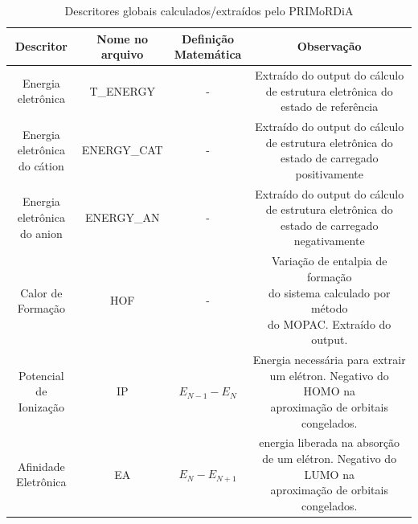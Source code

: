\documentclass[a4paper,11pt]{refart}
\begin{document}
\hspace*{-\leftmarginwidth}
\begin{minipage}{\fullwidth}
\begin{table}[H]
\centering	
\caption{Descritores globais calculados/extraídos pelo PRIMoRDiA}
\begin{tabular}{c|c|c|c}
\toprule
Descritor &\makecell{Nome no\\ arquivo}&\makecell{Definição\\Matemática}&Observação \\
\midrule
\makecell{Energia \\eletrônica} & T\_ENERGY&-&\makecell{Extraído do output do cálculo\\ de estrutura eletrônica do \\estado de referência}\\\hline
\makecell{Energia \\eletrônica\\do cátion} &ENERGY\_CAT &-& \makecell{Extraído do output do cálculo\\ de estrutura eletrônica do \\estado de carregado positivamente}\\\hline
\makecell{Energia \\eletrônica\\do anion} &ENERGY\_AN &-&\makecell{Extraído do output do cálculo\\ de estrutura eletrônica do \\estado de carregado negativamente}\\\hline
\makecell{Calor de\\Formação} & HOF&-&\makecell{Variação de entalpia de formação\\ do sistema calculado por método\\ do MOPAC. Extraído do output.} \\\hline
\makecell{Potencial \\de Ionização} & IP & $E_{N-1}-E_{N}$ & \makecell{Energia necessária para extrair \\um elétron. Negativo do HOMO na \\aproximação de orbitais congelados.}  \\  \hline	
\makecell{Afinidade \\Eletrônica}& EA & $E_{N}-E_{N+1}$ & \makecell{energia liberada na absorção \\de um elétron. Negativo do LUMO na \\aproximação de orbitais congelados.}   \\ \hline	

\end{tabular}
\end{table}
\end{minipage}
\end{document}
